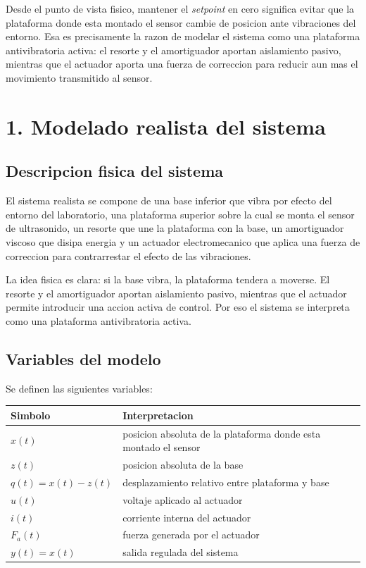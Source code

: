 \documentclass[11pt]{article}
\begin{document}
Desde el punto de vista fisico, mantener el \textit{setpoint} en cero significa evitar que la plataforma donde esta montado el sensor cambie de posicion ante vibraciones del entorno. Esa es precisamente la razon de modelar el sistema como una plataforma antivibratoria activa: el resorte y el amortiguador aportan aislamiento pasivo, mientras que el actuador aporta una fuerza de correccion para reducir aun mas el movimiento transmitido al sensor.

\section{1. Modelado realista del sistema}

\subsection{Descripcion fisica del sistema}

El sistema realista se compone de una base inferior que vibra por efecto del entorno del laboratorio, una plataforma superior sobre la cual se monta el sensor de ultrasonido, un resorte que une la plataforma con la base, un amortiguador viscoso que disipa energia y un actuador electromecanico que aplica una fuerza de correccion para contrarrestar el efecto de las vibraciones.

La idea fisica es clara: si la base vibra, la plataforma tendera a moverse. El resorte y el amortiguador aportan aislamiento pasivo, mientras que el actuador permite introducir una accion activa de control. Por eso el sistema se interpreta como una plataforma antivibratoria activa.

\subsection{Variables del modelo}

Se definen las siguientes variables:

\begin{center}
\small
\begin{tabular}{>{\raggedright\arraybackslash}p{2.7cm} >{\raggedright\arraybackslash}p{9.5cm}}
\toprule
\textbf{Simbolo} & \textbf{Interpretacion} \\
\midrule
$x(t)$ & posicion absoluta de la plataforma donde esta montado el sensor \\
$z(t)$ & posicion absoluta de la base \\
$q(t)=x(t)-z(t)$ & desplazamiento relativo entre plataforma y base \\
$u(t)$ & voltaje aplicado al actuador \\
$i(t)$ & corriente interna del actuador \\
$F_a(t)$ & fuerza generada por el actuador \\
$y(t)=x(t)$ & salida regulada del sistema \\
\bottomrule
\end{tabular}
\end{center}
\end{document}
